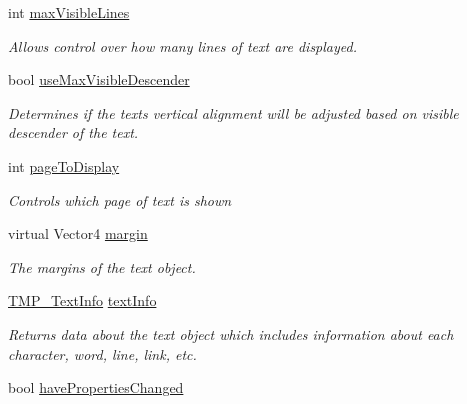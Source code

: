 \begin{DoxyCompactItemize}
int \mbox{\hyperlink{class_t_m_pro_1_1_t_m_p___text_a91ad865ced62808c08d2e48330b68533}{max\+Visible\+Lines}}
\begin{DoxyCompactList}\small\item\em Allows control over how many lines of text are displayed. \end{DoxyCompactList}\item 
bool \mbox{\hyperlink{class_t_m_pro_1_1_t_m_p___text_a4c2000ddd0b1c55d4804c6a458952776}{use\+Max\+Visible\+Descender}}
\begin{DoxyCompactList}\small\item\em Determines if the text\textquotesingle{}s vertical alignment will be adjusted based on visible descender of the text. \end{DoxyCompactList}\item 
int \mbox{\hyperlink{class_t_m_pro_1_1_t_m_p___text_af204b1b18dbc4f752600c66c381b6f81}{page\+To\+Display}}
\begin{DoxyCompactList}\small\item\em Controls which page of text is shown \end{DoxyCompactList}\item 
virtual Vector4 \mbox{\hyperlink{class_t_m_pro_1_1_t_m_p___text_a4b5ff3199be4781bc7b033d780bfb547}{margin}}
\begin{DoxyCompactList}\small\item\em The margins of the text object. \end{DoxyCompactList}\item 
\mbox{\hyperlink{class_t_m_pro_1_1_t_m_p___text_info}{T\+M\+P\+\_\+\+Text\+Info}} \mbox{\hyperlink{class_t_m_pro_1_1_t_m_p___text_a4b2d23d558ff8f9aecf5814f046bcef6}{text\+Info}}
\begin{DoxyCompactList}\small\item\em Returns data about the text object which includes information about each character, word, line, link, etc. \end{DoxyCompactList}\item 
bool \mbox{\hyperlink{class_t_m_pro_1_1_t_m_p___text_a7e0fb1ed735ea717f9b98373b9de6e73}{have\+Properties\+Changed}}

\end{DoxyCompactItemize}
